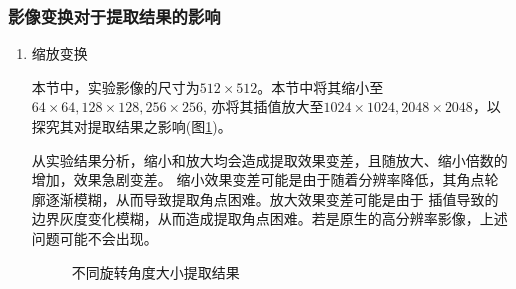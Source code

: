     \subsubsection{影像变换对于提取结果的影响}
        \begin{enumerate}
            \item 缩放变换
            
            \hspace{20pt}本节中，实验影像的尺寸为$512 \times 512$。本节中将其缩小至$64 \times 64,128 \times 128,256 \times 256$,
            亦将其插值放大至$1024 \times 1024,2048 \times 2048$，以探究其对提取结果之影响(图\ref{moravec_scale})。

            \hspace{20pt}从实验结果分析，缩小和放大均会造成提取效果变差，且随放大、缩小倍数的增加，效果急剧变差。
            缩小效果变差可能是由于随着分辨率降低，其角点轮廓逐渐模糊，从而导致提取角点困难。放大效果变差可能是由于
            插值导致的边界灰度变化模糊，从而造成提取角点困难。若是原生的高分辨率影像，上述问题可能不会出现。

            \begin{figure}[H]
                \centering
                \caption{不同旋转角度大小提取结果}
                \label{moravec_scale}
            \end{figure}
    

\end{enumerate}
